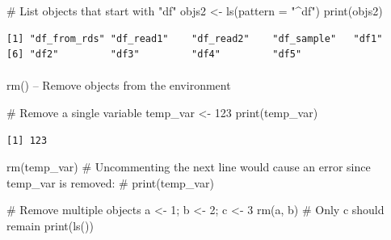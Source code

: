 \documentclass[
  letterpaper,
  DIV=11,
  numbers=noendperiod]{scrartcl}
\makeatletter
\let\oldparagraph\paragraph
\renewcommand{\paragraph}{
    \@ifstar
      \xxxParagraphStar
      \xxxParagraphNoStar
  }
\newcommand{\xxxParagraphStar}[1]{\oldparagraph*{#1}\mbox{}}
\newcommand{\xxxParagraphNoStar}[1]{\oldparagraph{#1}\mbox{}}
\newenvironment{Shaded}{\begin{snugshade}}{\end{snugshade}}
\newcommand{\AttributeTok}[1]{\textcolor[rgb]{0.40,0.45,0.13}{#1}}
\newcommand{\CommentTok}[1]{\textcolor[rgb]{0.37,0.37,0.37}{#1}}
\newcommand{\DecValTok}[1]{\textcolor[rgb]{0.68,0.00,0.00}{#1}}
\newcommand{\FunctionTok}[1]{\textcolor[rgb]{0.28,0.35,0.67}{#1}}
\newcommand{\NormalTok}[1]{\textcolor[rgb]{0.00,0.23,0.31}{#1}}
\newcommand{\OtherTok}[1]{\textcolor[rgb]{0.00,0.23,0.31}{#1}}
\newcommand{\StringTok}[1]{\textcolor[rgb]{0.13,0.47,0.30}{#1}}
\makeatother
\begin{document}
\begin{Shaded}
\begin{Highlighting}[]
\CommentTok{\#   List objects that start with "df"}
\NormalTok{objs2 }\OtherTok{\textless{}{-}} \FunctionTok{ls}\NormalTok{(}\AttributeTok{pattern =} \StringTok{"\^{}df"}\NormalTok{)}
\FunctionTok{print}\NormalTok{(objs2)}
\end{Highlighting}
\end{Shaded}

\begin{verbatim}
[1] "df_from_rds" "df_read1"    "df_read2"    "df_sample"   "df1"        
[6] "df2"         "df3"         "df4"         "df5"        
\end{verbatim}

\paragraph{rm() -- Remove objects from the
environment}\label{rm-remove-objects-from-the-environment}

\begin{Shaded}
\begin{Highlighting}[]
\CommentTok{\#   Remove a single variable}
\NormalTok{temp\_var }\OtherTok{\textless{}{-}} \DecValTok{123}
\FunctionTok{print}\NormalTok{(temp\_var)}
\end{Highlighting}
\end{Shaded}

\begin{verbatim}
[1] 123
\end{verbatim}

\begin{Shaded}
\begin{Highlighting}[]
\FunctionTok{rm}\NormalTok{(temp\_var)}
\CommentTok{\# Uncommenting the next line would cause an error since temp\_var is removed:}
\CommentTok{\# print(temp\_var)}

\CommentTok{\#   Remove multiple objects}
\NormalTok{a }\OtherTok{\textless{}{-}} \DecValTok{1}\NormalTok{; b }\OtherTok{\textless{}{-}} \DecValTok{2}\NormalTok{; c }\OtherTok{\textless{}{-}} \DecValTok{3}
\FunctionTok{rm}\NormalTok{(a, b)}
\CommentTok{\# Only \textquotesingle{}c\textquotesingle{} should remain}
\FunctionTok{print}\NormalTok{(}\FunctionTok{ls}\NormalTok{())}
\end{Highlighting}
\end{Shaded}
\end{document}
